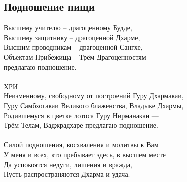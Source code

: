 \newpage
\subsection{Подношение пищи}

\vspace{1cm}
Высшему учителю – драгоценному Будде, \\
Высшему защитнику –  драгоценной Дхарме,\\
Высшим проводникам –  драгоценной Сангхе,\\
Объектам Прибежища – Трём Драгоценностям \\ \indent предлагаю подношение.\\
\\
ХРИ\\
Неизменному, свободному от построений Гуру Дхармакаи, \\
Гуру Самбхогакаи Великого блаженства, Владыке Дхармы, \\
Родившемуся в цветке лотоса Гуру Нирманакаи — \\
Трём Телам, Ваджрадхаре предлагаю подношение.\\
\\
Силой подношения, восхваления и молитвы к Вам \\
У меня и всех, кто пребывает здесь, в высшем месте \\
Да успокоятся недуги, лишения и вражда, \\
Пусть распространяются Дхарма и удача.\\
\\


